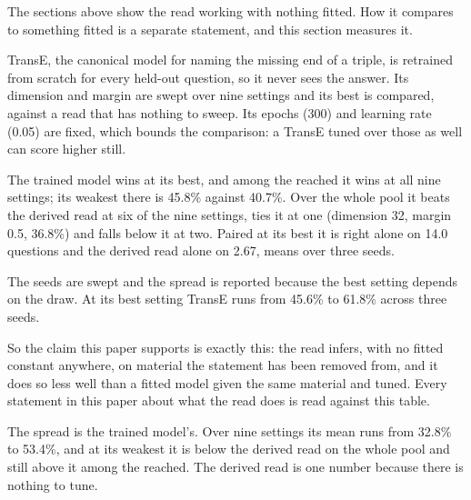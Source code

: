 \documentclass[10pt,letterpaper,twocolumn]{article}
\begin{document}
The sections above show the read working with nothing fitted. How it compares to something fitted is
a separate statement, and this section measures it.

TransE, the canonical model for naming the missing end of a triple, is retrained from scratch for
every held-out question, so it never sees the answer. Its dimension and margin are swept over nine
settings and its best is compared, against a read that has nothing to sweep. Its epochs (300) and
learning rate (0.05) are fixed, which bounds the comparison: a TransE tuned over those as well can
score higher still.


The trained model wins at its best, and among the reached it wins at all nine settings; its weakest
there is 45.8\% against 40.7\%. Over the whole pool it beats the derived read at six of the nine
settings, ties it at one (dimension 32, margin 0.5, 36.8\%) and falls below it at two. Paired at its
best it is right alone on 14.0 questions and the derived read alone on 2.67, means over three seeds.

The seeds are swept and the spread is reported because the best setting depends on the draw. At its
best setting TransE runs from 45.6\% to 61.8\% across three seeds.

So the claim this paper supports is exactly this: the read infers, with no fitted constant anywhere,
on material the statement has been removed from, and it does so less well than a fitted model given
the same material and tuned. Every statement in this paper about what the read does is read against
this table.

The spread is the trained model's. Over nine settings its mean runs from 32.8\% to 53.4\%, and at its
weakest it is below the derived read on the whole pool and still above it among the reached. The
derived read is one number because there is nothing to tune.
\end{document}
